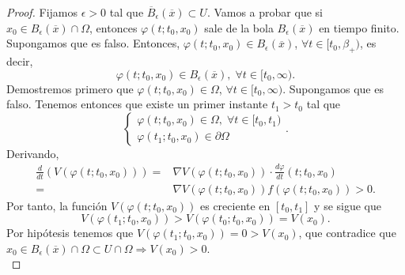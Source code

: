 \begin{proof}
Fijamos $\displaystyle \epsilon > 0 $ tal que $\displaystyle \overline{B}_{\epsilon }\left(\overline{x}\right)\subset U $. Vamos a probar que si $\displaystyle x_{0} \in B_{\epsilon }\left(\overline{x}\right)\cap \Omega  $, entonces $\displaystyle \varphi\left(t; t_{0}, x_{0}\right) $ sale de la bola $\displaystyle B_{\epsilon }\left(\overline{x}\right) $ en tiempo finito. 
Supongamos que es falso. Entonces, $\displaystyle \varphi\left(t; t_{0}, x_{0}\right)\in B_{\epsilon }\left(\overline{x}\right) $, $\displaystyle \forall t \in [t_{0}, \beta_{+ }) $, es decir, 
\[\varphi\left(t; t_{0}, x_{0}\right)\in B_{\epsilon }\left(\overline{x}\right), \; \forall t \in [t_{0}, \infty) .\]
Demostremos primero que $\displaystyle \varphi\left(t; t_{0}, x_{0}\right)\in \Omega  $, $\displaystyle \forall t \in [t_{0}, \infty) $. 
Supongamos que es falso. Tenemos entonces que existe un primer instante $\displaystyle t_{1} > t_{0} $ tal que  
	\[
	\begin{cases}
	\varphi\left(t; t_{0}, x_{0}\right)\in \Omega, \; \forall t \in [t_{0}, t_{1}) \\ 
	\varphi\left(t_{1}; t_{0}, x_{0}\right)\in \partial \Omega 
	\end{cases}
	.\]
	Derivando, 
	\[
	\begin{split}
		\frac{d}{dt}\left(V\left(\varphi\left(t; t_{0}, x_{0}\right)\right)\right) = & \nabla V\left(\varphi\left(t; t_{0}, x_{0}\right)\right) \cdot \frac{d\varphi}{dt}\left(t; t_{0}, x_{0}\right)\\
		= & \nabla V\left(\varphi\left(t; t_{0}, x_{0}\right)\right)f\left(\varphi\left(t; t_{0}, x_{0}\right)\right) > 0 .
	\end{split}
	\]
	Por tanto, la función $\displaystyle V\left(\varphi\left(t; t_{0}, x_{0}\right)\right) $ es creciente en $\displaystyle \left[t_{0}, t_{1}\right]  $ y se sigue que 
	\[V\left(\varphi\left(t_{1}; t_{0}, x_{0}\right)\right) > V\left(\varphi\left(t_{0}; t_{0}, x_{0}\right)\right) = V\left(x_{0}\right) .\]
Por hipótesis tenemos que $\displaystyle V\left(\varphi\left(t_{1}; t_{0}, x_{0}\right)\right) =0 > V\left(x_{0}\right)$, que contradice que $\displaystyle x_{0}\in B_{\epsilon }\left(\overline{x }\right)\cap \Omega \subset U \cap \Omega \Rightarrow V\left(x_{0}\right) > 0 $. \\


\end{proof}
